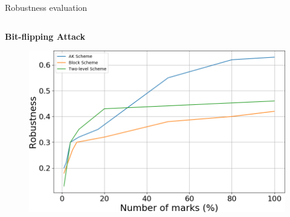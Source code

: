\documentclass[final,hyperref={pdfpagelabels=true}]{beamer}
\begin{document}
\begin{frame}
\begin{columns}[t]
\begin{column}{.45\textwidth}
\begin{block}{Robustness evaluation}
\begin{columns}
            \begin{column}{.49\textwidth}\centering
            \textcolor{myred}{\textbf{Bit-flipping Attack}}
            \begin{figure}
                \centering
                \includegraphics[width=\textwidth]{bit-flipping_poster.PNG}
            \end{figure}
            \end{column}
        \end{columns}
      \end{block}


\end{column}
\end{columns}
\end{frame}
\end{document}
